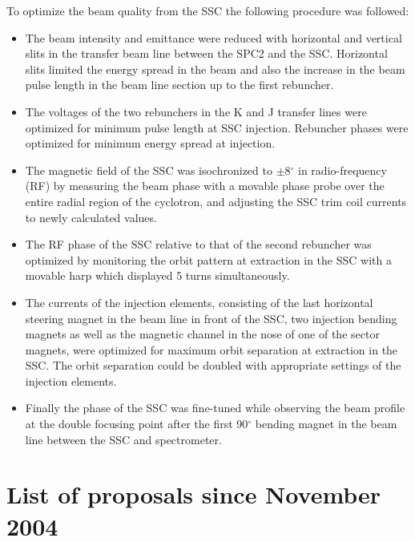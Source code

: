 \documentclass[11pt]{report}
\begin{document}
To optimize the beam quality from the SSC the following procedure was followed:
\begin{itemize}
\item The beam intensity and emittance were reduced with horizontal and vertical 
      slits in the transfer beam line between the SPC2 and the SSC. 
      Horizontal slits limited the energy spread in the beam and also the
      increase in the beam pulse length in the beam line section up to the first rebuncher.
\item The voltages of the two rebunchers in the K and J transfer lines were optimized for minimum 
      pulse length at SSC injection.
      Rebuncher phases were optimized for minimum energy spread at injection.
\item The magnetic field of the SSC was isochronized to $\pm$8$^{\circ}$ in radio-frequency (RF) 
      by measuring the beam phase with a movable phase probe over the entire radial region of 
      the cyclotron, and adjusting the SSC trim coil currents to newly calculated values. 
\item The RF phase of the SSC relative to that of the second rebuncher was optimized 
      by monitoring the orbit pattern at extraction in the SSC with a movable 
      harp which displayed 5 turns simultaneously.
\item The currents of the injection elements, consisting of the last horizontal steering magnet 
      in the beam line
      in front of the SSC, two injection bending magnets as well as the magnetic channel in the nose of one
      of the sector magnets, were optimized for maximum orbit separation at extraction in the SSC.
      The orbit separation could be doubled with appropriate settings of the injection elements.
\item Finally the phase of the SSC was fine-tuned while observing the beam profile at the 
      double focusing point after the first 90$^{\circ}$ bending magnet in the beam line
      between the SSC and spectrometer.
\end{itemize}


\chapter{List of proposals since November 2004}
\end{document}
